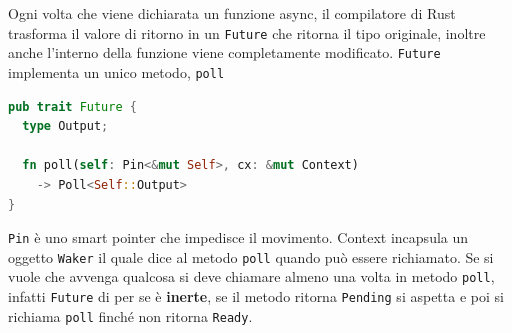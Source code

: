 \documentclass[12pt]{article}
\begin{document}
Ogni volta che viene dichiarata un funzione async, il compilatore di Rust trasforma il valore di ritorno in un \texttt{Future} che ritorna il tipo originale, inoltre anche l'interno della funzione viene completamente modificato. \texttt{Future} implementa un unico metodo, \texttt{poll}
\begin{lstlisting}[language=rust]
pub trait Future {
  type Output;

  fn poll(self: Pin<&mut Self>, cx: &mut Context)
    -> Poll<Self::Output>
}
\end{lstlisting}
\texttt{Pin} \`e uno smart pointer che impedisce il movimento. Context incapsula un oggetto \texttt{Waker} il quale dice al metodo \texttt{poll} quando pu\`o essere richiamato. Se si vuole che avvenga qualcosa si deve chiamare almeno una volta in metodo \texttt{poll}, infatti \texttt{Future} di per se \`e \textbf{inerte}, se il metodo ritorna \texttt{Pending} si aspetta e poi si richiama \texttt{poll} finch\'e non ritorna \texttt{Ready}.
\end{document}
